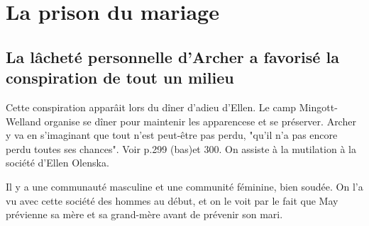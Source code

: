 \documentclass[a4paper,12pt]{article}
\begin{document}
\section{La prison du mariage}

\subsection{La lâcheté personnelle d'Archer a favorisé la conspiration de tout un milieu}

Cette conspiration apparâit lors du dîner d'adieu d'Ellen. Le camp Mingott-Welland organise se dîner pour maintenir les apparencese et se préserver. Archer y va en s'imaginant que tout n'est peut-être pas perdu, "qu'il n'a pas encore perdu toutes ses chances". Voir p.299 (bas)et 300. On assiste à la mutilation à la société d'Ellen Olenska.

Il y a une communauté masculine et une communité féminine, bien soudée. On l'a vu avec cette société des hommes au début, et on le voit par le fait que May prévienne sa mère et sa grand-mère avant de prévenir son mari.
\end{document}
